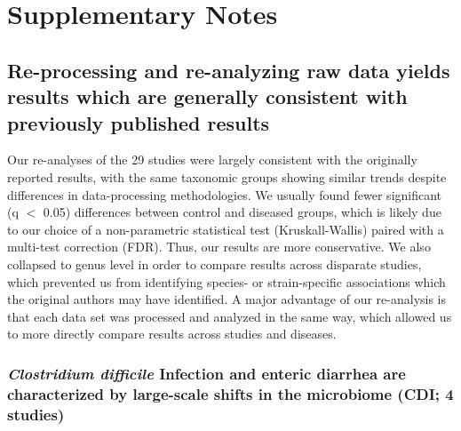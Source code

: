 \section{Supplementary Notes}

\subsection{Re-processing and re-analyzing raw data yields results which are generally consistent with previously published results}\label{sec:lit_comp}

Our re-analyses of the 29 studies were largely consistent with the originally reported results, with the same taxonomic groups showing similar trends despite differences in data-processing methodologies.
We usually found fewer significant (q $<$ 0.05) differences between control and diseased groups, which is likely due to our choice of a non-parametric statistical test (Kruskall-Wallis) paired with a multi-test correction (FDR).
Thus, our results are more conservative.
We also collapsed to genus level in order to compare results across disparate studies, which prevented us from identifying species- or strain-specific associations which the original authors may have identified.
A major advantage of our re-analysis is that each data set was processed and analyzed in the same way, which allowed us to more directly compare results across studies and diseases.

\subsubsection{\textit{Clostridium difficile} Infection and enteric diarrhea are characterized by large-scale shifts in the microbiome (CDI; 4 studies)}

